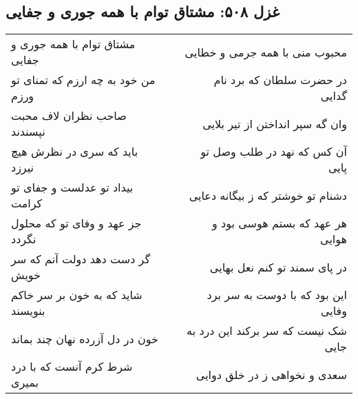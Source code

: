 \begin{center}
\section*{غزل ۵۰۸: مشتاق توام با همه جوری و جفایی}
\label{sec:508}
\begin{longtable}{l p{0.5cm} r}
مشتاق توام با همه جوری و جفایی
&&
محبوب منی با همه جرمی و خطایی
\\
من خود به چه ارزم که تمنای تو ورزم
&&
در حضرت سلطان که برد نام گدایی
\\
صاحب نظران لاف محبت نپسندند
&&
وان گه سپر انداختن از تیر بلایی
\\
باید که سری در نظرش هیچ نیرزد
&&
آن کس که نهد در طلب وصل تو پایی
\\
بیداد تو عدلست و جفای تو کرامت
&&
دشنام تو خوشتر که ز بیگانه دعایی
\\
جز عهد و وفای تو که محلول نگردد
&&
هر عهد که بستم هوسی بود و هوایی
\\
گر دست دهد دولت آنم که سر خویش
&&
در پای سمند تو کنم نعل بهایی
\\
شاید که به خون بر سر خاکم بنویسند
&&
این بود که با دوست به سر برد وفایی
\\
خون در دل آزرده نهان چند بماند
&&
شک نیست که سر برکند این درد به جایی
\\
شرط کرم آنست که با درد بمیری
&&
سعدی و نخواهی ز در خلق دوایی
\\
\end{longtable}
\end{center}
